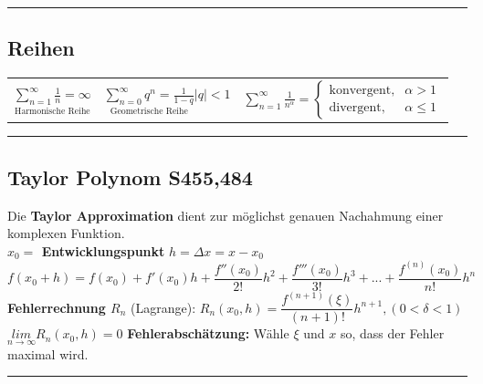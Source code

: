 \hrule
\subsection{Reihen}
\begin{tabulary}{12cm}{LLL}
	
$\underset{\text{Harmonische Reihe}}{\sum_{n=1}^\infty \frac{1}{n} = \infty}$ & $\underset{\text{Geometrische Reihe}}{\sum_{n=0}^\infty q^n = \frac{1}{1-q}}$\qquad$|q|<1$&
$\sum_{n=1}^\infty \frac{1}{n^\alpha} = \begin{cases} \text{konvergent}, & \alpha > 1 \\ \text{divergent}, & \alpha \le 1 \end{cases}$\\
\end{tabulary}
\hrule
\subsection{Taylor Polynom \color{red}S455,484}
Die \textbf{Taylor Approximation} dient zur möglichst genauen Nachahmung einer komplexen Funktion.\\
\textbf{$x_{0}=$ Entwicklungspunkt} \qquad \underline{$h=\varDelta x=x-x_{0}$} \qquad $f(x_{0}+h)=f(x_{0})+f'(x_{0})h+\dfrac{f''(x_{0})}{2!}h^{2}+\dfrac{f'''(x_{0})}{3!}h^{3}+...+\dfrac{f^{(n)}(x_{0})}{n!}h^{n}$\\
\textbf{Fehlerrechnung $R_{n}$} (Lagrange): \qquad $R_{n}(x_{0},h)=\dfrac{f^{(n+1)}(\xi)}{(n+1)!}h^{n+1}, (0<\delta<1)$ \qquad \qquad
$\underset{n\rightarrow \infty}{lim} R_{n}(x_{0},h)=0$
\textbf{Fehlerabschätzung:} Wähle $\xi$ und $x$ so, dass der Fehler maximal wird.
\hrule
